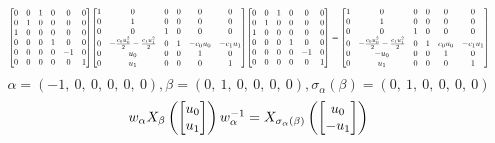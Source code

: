 \documentclass[11pt]{article}
\theoremstyle{definition}
\begin{document}
\[
\scaletoalign{\textwidth}{{\left[\begin{matrix}0 & 0 & 1 & 0 & 0 & 0\\0 & 1 & 0 & 0 & 0 & 0\\1 & 0 & 0 & 0 & 0 & 0\\0 & 0 & 0 & 1 & 0 & 0\\0 & 0 & 0 & 0 & -1 & 0\\0 & 0 & 0 & 0 & 0 & 1\end{matrix}\right]} {\left[\begin{matrix}1 & 0 & 0 & 0 & 0 & 0\\0 & 1 & 0 & 0 & 0 & 0\\0 & 0 & 1 & 0 & 0 & 0\\0 & - \frac{c_{0} u_{0}^{2}}{2} - \frac{c_{1} u_{1}^{2}}{2} & 0 & 1 & - c_{0} u_{0} & - c_{1} u_{1}\\0 & u_{0} & 0 & 0 & 1 & 0\\0 & u_{1} & 0 & 0 & 0 & 1\end{matrix}\right]} {\left[\begin{matrix}0 & 0 & 1 & 0 & 0 & 0\\0 & 1 & 0 & 0 & 0 & 0\\1 & 0 & 0 & 0 & 0 & 0\\0 & 0 & 0 & 1 & 0 & 0\\0 & 0 & 0 & 0 & -1 & 0\\0 & 0 & 0 & 0 & 0 & 1\end{matrix}\right]} = {\left[\begin{matrix}1 & 0 & 0 & 0 & 0 & 0\\0 & 1 & 0 & 0 & 0 & 0\\0 & 0 & 1 & 0 & 0 & 0\\0 & - \frac{c_{0} u_{0}^{2}}{2} - \frac{c_{1} u_{1}^{2}}{2} & 0 & 1 & c_{0} u_{0} & - c_{1} u_{1}\\0 & - u_{0} & 0 & 0 & 1 & 0\\0 & u_{1} & 0 & 0 & 0 & 1\end{matrix}\right]}}
\]
\[
\alpha = \left( -1, \  0, \  0, \  0, \  0, \  0\right), \beta = \left( 0, \  1, \  0, \  0, \  0, \  0\right), \sigma_{\alpha}(\beta) = \left( 0, \  1, \  0, \  0, \  0, \  0\right)
\]
\[
\scaletoalign{\textwidth}{w_{\alpha} X_{\beta}\left(\left[\begin{matrix}u_{0}\\u_{1}\end{matrix}\right]\right) w_{\alpha}^{-1} = X_{\sigma_{\alpha}\left(\beta\right)}\left(\left[\begin{matrix}u_{0}\\- u_{1}\end{matrix}\right]\right)}
\]
\end{document}
